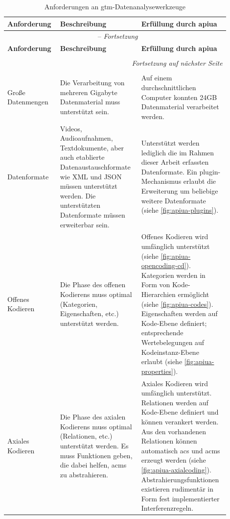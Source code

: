 \begin{landscape}
\begin{longtable}{p{0.2\linewidth} p{0.35\linewidth} p{0.35\linewidth}}  
  \multicolumn{1}{l}{\textbf{Anforderung}} & \multicolumn{1}{l}{\textbf{Beschreibung}} & \multicolumn{1}{l}{\textbf{Erfüllung durch \gls{apiua}}} \\ \hline 
  \endfirsthead

  \multicolumn{3}{c}{\tablename\ \thetable{} -- \textit{Fortsetzung}} \\
  \multicolumn{1}{l}{\textbf{Anforderung}} & \multicolumn{1}{l}{\textbf{Beschreibung}} & \multicolumn{1}{l}{\textbf{Erfüllung durch \gls{apiua}}} \\ \hline 
  \endhead

  \\
  \multicolumn{3}{r}{\textit{Fortsetzung auf nächster Seite}} \\
  \endfoot

  \caption{Anforderungen an \gls{gtm}-Datenanalysewerkzeuge}
  \label{tab:APIUARequirements} \\
  \endlastfoot

  Große Datenmengen &
  Die Verarbeitung von mehreren Gigabyte Datenmaterial muss unterstützt sein. &
  Auf einem durchschnittlichen Computer konnten 24GB Datenmaterial verarbeitet werden. \\
  
  Datenformate &
  Videos, Audioaufnahmen, Textdokumente, aber auch etablierte Datenaustauschformate wie XML und JSON müssen unterstützt werden. Die unterstützten Datenformate müssen erweiterbar sein. &
  Unterstützt werden lediglich die im Rahmen dieser Arbeit erfassten Datenformate. Ein \gls{plugin}-Mechanismus erlaubt die Erweiterung um beliebige weitere Datenformate (siehe \autoref{fig:apiua-plugins}). \\
  
  Offenes Kodieren &
  Die Phase des offenen Kodierens muss optimal (Kategorien, Eigenschaften, etc.) unterstützt werden. &
  Offenes Kodieren wird umfänglich unterstützt (siehe \autoref{fig:apiua-opencoding-cd}). Kategorien werden in Form von Kode-Hierarchien ermöglicht (siehe \autoref{fig:apiua-codes}). Eigenschaften werden auf Kode-Ebene definiert; entsprechende Wertebelegungen auf Kodeinstanz-Ebene erlaubt (siehe \autoref{fig:apiua-properties}). \\
  
  Axiales Kodieren &
  Die Phase des axialen Kodierens muss optimal (Relationen, etc.) unterstützt werden. Es muss Funktionen geben, die dabei helfen, \glspl{acm} zu abstrahieren. &
  Axiales Kodieren wird umfänglich unterstützt. Relationen werden auf Kode-Ebene definiert und können verankert werden. Aus den vorhandenen Relationen können automatisch \glspl{ac} und \glspl{acm} erzeugt werden (siehe \autoref{fig:apiua-axialcoding}). Abstrahierungsfunktionen existieren rudimentär in Form fest implementierter Interferenzregeln. \\
  

\end{longtable}
\end{landscape}
